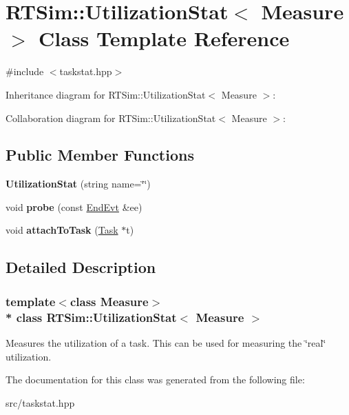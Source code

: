 \hypertarget{classRTSim_1_1UtilizationStat}{}\section{R\+T\+Sim\+:\+:Utilization\+Stat$<$ Measure $>$ Class Template Reference}
\label{classRTSim_1_1UtilizationStat}


{\ttfamily \#include $<$taskstat.\+hpp$>$}



Inheritance diagram for R\+T\+Sim\+:\+:Utilization\+Stat$<$ Measure $>$\+:


Collaboration diagram for R\+T\+Sim\+:\+:Utilization\+Stat$<$ Measure $>$\+:
\subsection*{Public Member Functions}
\begin{DoxyCompactItemize}
\item 
{\bfseries Utilization\+Stat} (string name=\char`\"{}\char`\"{})\hypertarget{classRTSim_1_1UtilizationStat_a9859fa3f3229777126e3cb14301d31d2}{}\label{classRTSim_1_1UtilizationStat_a9859fa3f3229777126e3cb14301d31d2}

\item 
void {\bfseries probe} (const \hyperlink{classRTSim_1_1EndEvt}{End\+Evt} \&ee)\hypertarget{classRTSim_1_1UtilizationStat_a41ab09a0b5547097f7ecc9e3e9bd25ac}{}\label{classRTSim_1_1UtilizationStat_a41ab09a0b5547097f7ecc9e3e9bd25ac}

\item 
void {\bfseries attach\+To\+Task} (\hyperlink{classRTSim_1_1Task}{Task} $\ast$t)\hypertarget{classRTSim_1_1UtilizationStat_af9fb09b219499c31145d27907ff0ce86}{}\label{classRTSim_1_1UtilizationStat_af9fb09b219499c31145d27907ff0ce86}

\end{DoxyCompactItemize}


\subsection{Detailed Description}
\subsubsection*{template$<$class Measure$>$\\*
class R\+T\+Sim\+::\+Utilization\+Stat$<$ Measure $>$}

Measures the utilization of a task. This can be used for measuring the \char`\"{}real\char`\"{} utilization. 

The documentation for this class was generated from the following file\+:\begin{DoxyCompactItemize}
\item 
src/taskstat.\+hpp\end{DoxyCompactItemize}

